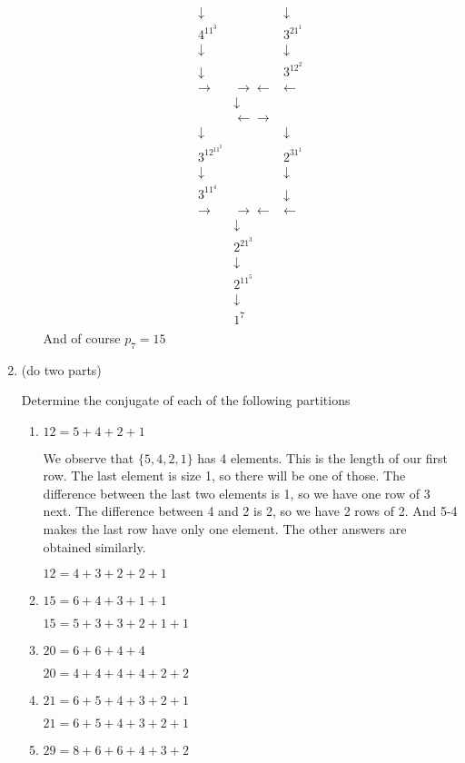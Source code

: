\documentclass{article}
\begin{document}
\begin{enumerate}
\begin{enumerate}
\begin{align*}
\begin{matrix}
      \downarrow&&\downarrow\\
      4^11^3&&3^21^1\\
      \downarrow&&\downarrow\\
      \downarrow&&3^12^2\\
      \to&\to\leftarrow&\leftarrow\\
      &\downarrow\\
      &\leftarrow\to&\\
      \downarrow&&\downarrow\\
      3^12^11^2&&2^31^1\\
      \downarrow&&\downarrow\\
      3^11^4&&\downarrow\\
      \to&\to\leftarrow&\leftarrow\\
      &\downarrow\\
      &2^21^3\\
      &\downarrow\\
      &2^11^5\\
      &\downarrow\\
      &1^7
      \end{matrix}
    \end{align*}
    And of course $p_7=15$
  \end{enumerate}
  \setcounter{enumi}{25}
  \item
  (do two parts)
  
  Determine the conjugate of each of the following partitions
  \begin{enumerate}
    \item
    $12=5+4+2+1$

    We observe that $\{5,4,2,1\}$ has 4 elements. This is the length of our first row. The last element is size 1, so there will be one of those. The difference between the last two elements is 1, so we have one row of 3 next. The difference between 4 and 2 is 2, so we have 2 rows of 2. And 5-4 makes the last row have only one element. The other answers are obtained similarly.

    $12=4+3+2+2+1$
    \item
    $15=6+4+3+1+1$

    $15=5+3+3+2+1+1$
    \item
    $20=6+6+4+4$
    
    $20=4+4+4+4+2+2$
    \item
    $21=6+5+4+3+2+1$

    $21=6+5+4+3+2+1$
    \item
    $29=8+6+6+4+3+2$


\end{enumerate}
\end{enumerate}
\end{document}
